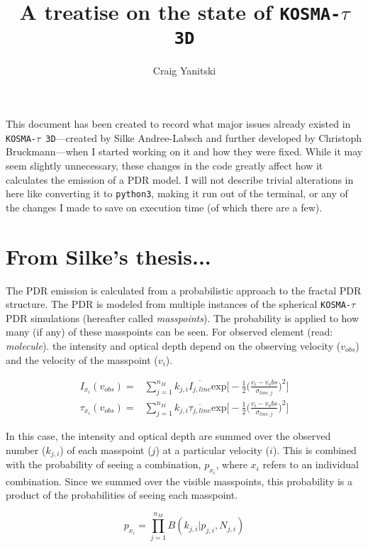\documentclass[onecolumn]{article}
\title{A treatise on the state of \texttt{KOSMA-$\tau$ 3D}}
\author{Craig Yanitski}
\date{}
\begin{document}
  \maketitle
  This document has been created to record what major issues already existed in \texttt{KOSMA-$\tau$ 3D}---created by Silke Andree-Labsch and further developed by Christoph Bruckmann---when I started working on it and how they were fixed. While it may seem slightly unnecessary, these changes in the code greatly affect how it calculates the emission of a PDR model. I will not describe trivial alterations in here like converting it to \texttt{python3}, making it run out of the terminal, or any of the changes I made to save on execution time (of which there are a few).
  
  \section{From Silke's thesis...}
  The PDR emission is calculated from a probabilistic approach to the fractal PDR structure. The PDR is modeled from multiple instances of the spherical \texttt{KOSMA-$\tau$} PDR simulations (hereafter called \textit{masspoints}). The probability is applied to how many (if any) of these masspoints can be seen. For observed element (read: \textit{molecule}). the intensity and optical depth depend on the observing velocity ($v_{obs}$) and the velocity of the masspoint ($v_i$).
  
  \begin{align*}
    I_{x_i}(v_{obs}) =& \sum_{j=1}^{n_M} k_{j,i} \overline{I_{j,line}} \mathrm{exp}\big[-\frac{1}{2}\big(\frac{v_i-v_obs}{\sigma_{line,j}}\big)^2\big] \\
    \tau_{x_i}(v_{obs}) =& \sum_{j=1}^{n_M} k_{j,i} \overline{\tau_{j,line}} \mathrm{exp}\big[-\frac{1}{2}\big(\frac{v_i-v_obs}{\sigma_{line,j}}\big)^2\big]
  \end{align*}
  
  In this case, the intensity and optical depth are summed over the observed number ($k_{j,i}$) of each masspoint ($j$) at a particular velocity ($i$). This is combined with the probability of seeing a combination, $p_{x_i}$, where $x_i$ refers to an individual combination. Since we summed over the visible masspoints, this probability is a product of the probabilities of seeing each masspoint.
  
  \begin{equation*}
    p_{x_i} = \prod_{j=1}^{n_M} B(k_{j,i}|p_{j,i}, N_{j,i})
  \end{equation*}
  
\end{document}
